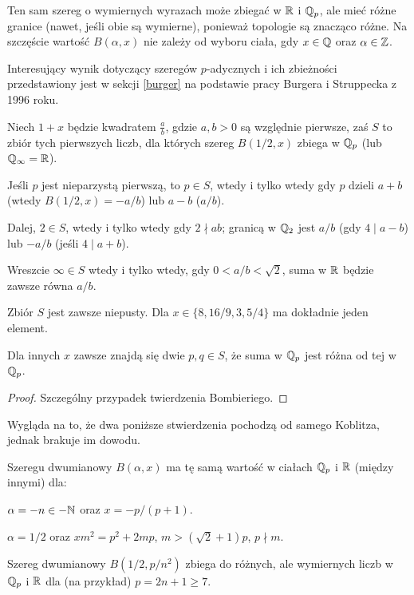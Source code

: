 Ten sam szereg o wymiernych wyrazach może zbiegać w $\mathbb R$ i $\mathbb Q_p$, ale mieć różne granice (nawet, jeśli obie są wymierne), ponieważ topologie są znacząco różne.
Na szczęście wartość $B(\alpha, x)$ nie zależy od wyboru ciała, gdy $x \in \mathbb Q$ oraz $\alpha \in \mathbb Z$.

Interesujący wynik dotyczący szeregów $p$-adycznych i ich zbieżności przedstawiony jest w sekcji \ref{burger} na podstawie pracy Burgera i Struppecka z 1996 roku.


\begin{fakt}
	Niech $1+x$ będzie kwadratem $\frac ab$, gdzie $a, b > 0$ są względnie pierwsze, zaś $S$ to zbiór tych pierwszych liczb, dla których szereg $B(1/2,x)$ zbiega w $\mathbb Q_p$ (lub $\mathbb Q_\infty = \mathbb R$).
	\begin{enumx}
		\item Jeśli $p$ jest nieparzystą pierwszą, to $p \in S$, wtedy i tylko wtedy gdy $p$ dzieli $a+b$ (wtedy $B(1/2,x) = -a/b$) lub $a-b$ ($a/b$).
		\item Dalej, $2 \in S$, wtedy i tylko wtedy gdy $2 \nmid ab$; granicą w $\mathbb Q_2$ jest $a/b$ (gdy $4 \mid a - b$) lub $-a/b$ (jeśli $4 \mid a + b$).
		\item Wreszcie $\infty \in S$ wtedy i tylko wtedy, gdy $0 < a/b < \sqrt{2}$, suma w $\mathbb R$ będzie zawsze równa $a/b$.
		\item Zbiór $S$ jest zawsze niepusty.
		Dla $x \in \{8, 16/9, 3, 5/4\}$ ma dokładnie jeden element.
		\item Dla innych $x$ zawsze znajdą się dwie $p, q \in S$, że suma w $\mathbb Q_p$ jest różna od tej w $\mathbb Q_p$.
	\end{enumx}
\end{fakt}

\begin{proof}
	Szczególny przypadek twierdzenia Bombieriego.
\end{proof}

Wygląda na to, że dwa poniższe stwierdzenia pochodzą od samego Koblitza, jednak brakuje im dowodu.

\begin{fakt}
	Szeregu  dwumianowy $B(\alpha, x)$ ma tę samą wartość w ciałach $\mathbb Q_p$ i $\mathbb R$ (między innymi) dla:
	\begin{itemx}
	\item $\alpha = -n \in - \mathbb N$ oraz $x = -p / (p+1)$.
	\item $\alpha = 1/2$ oraz $xm^2 = p^2 + 2mp$, $m > (\sqrt 2 + 1)p$, $p \nmid m$.
	\end{itemx}
\end{fakt}

\begin{fakt}
	Szereg dwumianowy $B(1/2, p/n^2)$ zbiega do różnych, ale wymiernych liczb w $\mathbb Q_p$ i $\mathbb R$ dla (na przykład) $p = 2n+1 \ge 7$.
\end{fakt}
